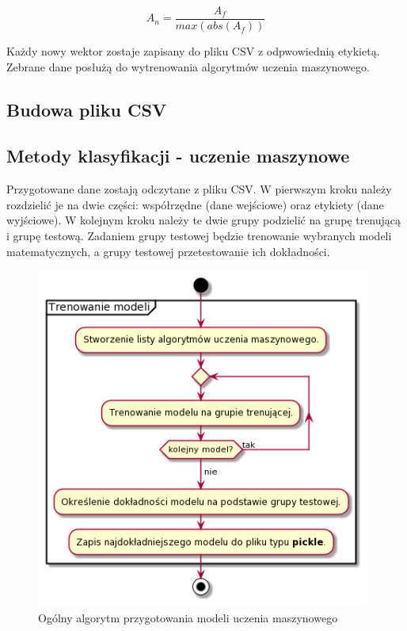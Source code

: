     
    \begin{equation*}
        A_n=\dfrac{A_f}{max(abs(A_f))}
    \end{equation*}
    
    \quad Każdy nowy wektor zostaje zapisany do pliku CSV z odpwowiednią etykietą. Zebrane dane posłużą do wytrenowania algorytmów uczenia maszynowego.     
    
    \subsection{Budowa pliku CSV}

    \subsection{Metody klasyfikacji - uczenie maszynowe}
    
    \quad Przygotowane dane zostają odczytane z pliku CSV. W pierwszym kroku należy rozdzielić je na dwie części: współrzędne (dane wejściowe) oraz etykiety (dane wyjściowe). W kolejnym kroku należy te dwie grupy podzielić na grupę trenującą i grupę testową. Zadaniem grupy testowej będzie trenowanie wybranych modeli matematycznych, a grupy testowej przetestowanie ich dokładności. 

    \begin{figure}[H]
        \begin{center}
            \includegraphics[width=11cm]{../images/train_models.png}
            \caption{Ogólny algorytm przygotowania modeli uczenia maszynowego}
        \end{center}
    \end{figure}
    
